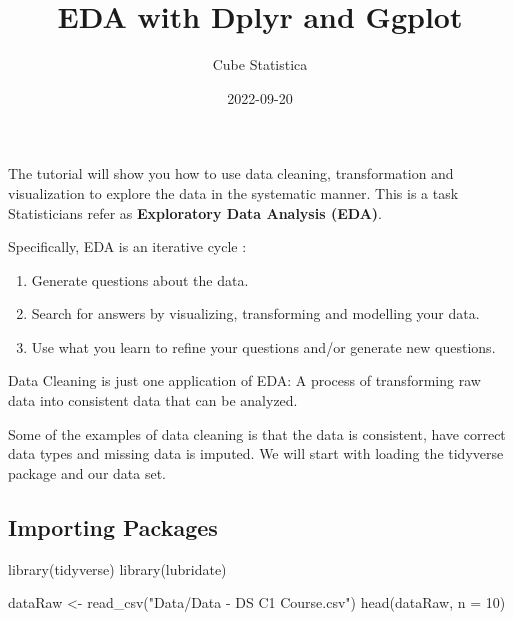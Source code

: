 \documentclass[
]{article}
\title{EDA with Dplyr and Ggplot}
\author{Cube Statistica}
\date{2022-09-20}
\newenvironment{Shaded}{\begin{snugshade}}{\end{snugshade}}
\newcommand{\AttributeTok}[1]{\textcolor[rgb]{0.77,0.63,0.00}{#1}}
\newcommand{\DecValTok}[1]{\textcolor[rgb]{0.00,0.00,0.81}{#1}}
\newcommand{\FunctionTok}[1]{\textcolor[rgb]{0.00,0.00,0.00}{#1}}
\newcommand{\NormalTok}[1]{#1}
\newcommand{\OtherTok}[1]{\textcolor[rgb]{0.56,0.35,0.01}{#1}}
\newcommand{\StringTok}[1]{\textcolor[rgb]{0.31,0.60,0.02}{#1}}
\providecommand{\tightlist}{%
  \setlength{\itemsep}{0pt}\setlength{\parskip}{0pt}}
\begin{document}
\maketitle

The tutorial will show you how to use data cleaning, transformation and
visualization to explore the data in the systematic manner. This is a
task Statisticians refer as \textbf{Exploratory Data Analysis (EDA)}.

Specifically, EDA is an iterative cycle :

\begin{enumerate}
\def\labelenumi{\arabic{enumi}.}
\tightlist
\item
  Generate questions about the data.
\item
  Search for answers by visualizing, transforming and modelling your
  data.
\item
  Use what you learn to refine your questions and/or generate new
  questions.
\end{enumerate}

Data Cleaning is just one application of EDA: A process of transforming
raw data into consistent data that can be analyzed.

Some of the examples of data cleaning is that the data is consistent,
have correct data types and missing data is imputed. We will start with
loading the tidyverse package and our data set.

\hypertarget{importing-packages}{%
\subsection{Importing Packages}\label{importing-packages}}

\begin{Shaded}
\begin{Highlighting}[]
\FunctionTok{library}\NormalTok{(tidyverse)}
\FunctionTok{library}\NormalTok{(lubridate)}
\end{Highlighting}
\end{Shaded}

\begin{Shaded}
\begin{Highlighting}[]
\NormalTok{dataRaw }\OtherTok{\textless{}{-}} \FunctionTok{read\_csv}\NormalTok{(}\StringTok{"Data/Data {-} DS C1 Course.csv"}\NormalTok{)}
\FunctionTok{head}\NormalTok{(dataRaw, }\AttributeTok{n =} \DecValTok{10}\NormalTok{)}
\end{Highlighting}
\end{Shaded}
\end{document}
